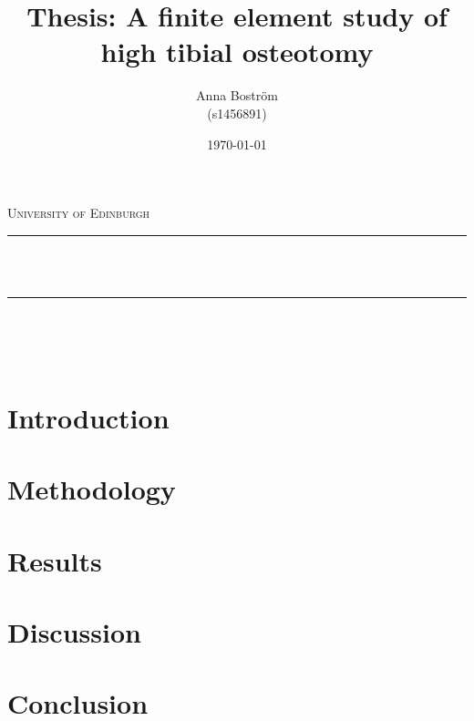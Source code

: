 \documentclass[11pt]{article}
\title{Thesis: A finite element study of high tibial osteotomy}		%
\author{Anna Bostr\"om \\ (s1456891)}		%
\date{\today}											%
\makeatletter
\let\thetitle\@title
\let\theauthor\@author
\let\thedate\@date
\makeatother
\begin{document}

\begin{titlepage}
	\centering
    \vspace*{0.1 cm}
    \textsc{\LARGE University of Edinburgh}\\[2.0 cm]	%
	\rule{\linewidth}{0.2 mm} \\[0.4 cm]
	{ \huge \bfseries \thetitle}\\
	\rule{\linewidth}{0.2 mm} \\[1 cm]
	
	{\large \theauthor}\\[1 cm]		%
	
	{\large \thedate}\\[2 cm]
 
	\vspace*{-40pt}
    
    	\begin{abstract}
		
\noindent
	\end{abstract}
	
\end{titlepage}


\tableofcontents
\newpage
\listoffigures
\newpage
\listoftables


\newpage
\section{Introduction}

\cite{Mulches}



\newpage
\section{Methodology}


\newpage
\section{Results}



\newpage
\section{Discussion}



\newpage
\section{Conclusion}
\end{document}
